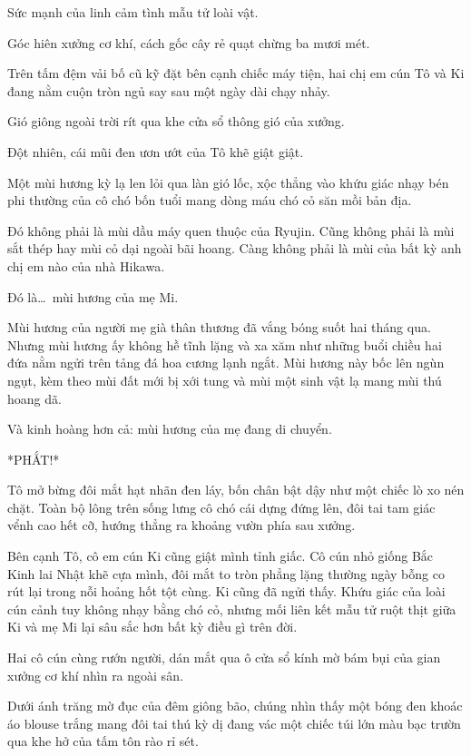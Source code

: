 \documentclass[../main.tex]{subfiles}
\begin{document}
Sức mạnh của linh cảm tình mẫu tử loài vật.

\ct

Góc hiên xưởng cơ khí, cách gốc cây rẻ quạt chừng ba mươi mét.

Trên tấm đệm vải bố cũ kỹ đặt bên cạnh chiếc máy tiện, hai chị em cún Tô và Ki đang nằm cuộn tròn ngủ say sau một ngày dài chạy nhảy.

Gió giông ngoài trời rít qua khe cửa sổ thông gió của xưởng.

Đột nhiên, cái mũi đen ươn ướt của Tô khẽ giật giật.

Một mùi hương kỳ lạ len lỏi qua làn gió lốc, xộc thẳng vào khứu giác nhạy bén phi thường của cô chó bốn tuổi mang dòng máu chó cỏ săn mồi bản địa.

Đó không phải là mùi dầu máy quen thuộc của Ryujin. Cũng không phải là mùi sắt thép hay mùi cỏ dại ngoài bãi hoang. Càng không phải là mùi của bất kỳ anh chị em nào của nhà Hikawa.

Đó là\dots\ mùi hương của mẹ Mi.

Mùi hương của người mẹ già thân thương đã vắng bóng suốt hai tháng qua. Nhưng mùi hương ấy không hề tĩnh lặng và xa xăm như những buổi chiều hai đứa nằm ngửi trên tảng đá hoa cương lạnh ngắt. Mùi hương này bốc lên ngùn ngụt, kèm theo mùi đất mới bị xới tung và mùi một sinh vật lạ mang mùi thú hoang dã.

Và kinh hoàng hơn cả: mùi hương của mẹ đang di chuyển.

*PHẮT!*

Tô mở bừng đôi mắt hạt nhãn đen láy, bốn chân bật dậy như một chiếc lò xo nén chặt. Toàn bộ lông trên sống lưng cô chó cái dựng đứng lên, đôi tai tam giác vểnh cao hết cỡ, hướng thẳng ra khoảng vườn phía sau xưởng.

Bên cạnh Tô, cô em cún Ki cũng giật mình tỉnh giấc. Cô cún nhỏ giống Bắc Kinh lai Nhật khẽ cựa mình, đôi mắt to tròn phẳng lặng thường ngày bỗng co rút lại trong nỗi hoảng hốt tột cùng. Ki cũng đã ngửi thấy. Khứu giác của loài cún cảnh tuy không nhạy bằng chó cỏ, nhưng mối liên kết mẫu tử ruột thịt giữa Ki và mẹ Mi lại sâu sắc hơn bất kỳ điều gì trên đời.

Hai cô cún cùng rướn người, dán mắt qua ô cửa sổ kính mờ bám bụi của gian xưởng cơ khí nhìn ra ngoài sân.

Dưới ánh trăng mờ đục của đêm giông bão, chúng nhìn thấy một bóng đen khoác áo blouse trắng mang đôi tai thú kỳ dị đang vác một chiếc túi lớn màu bạc trườn qua khe hở của tấm tôn rào rỉ sét.
\end{document}
